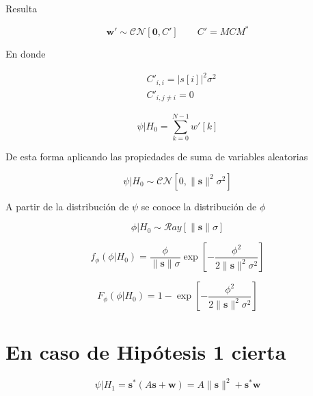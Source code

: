 Resulta

\begin{equation}
    \mathbf{w}'  \sim \mathcal{CN}[\mathbf{0}, C'] \qquad C' = MCM^\ast
\end{equation}

En donde

\begin{equation}
    \begin{aligned}
        &C'_{i,i} = |s[i]|^2 \sigma^2\\
        &C'_{i,j\ne i} = 0        
    \end{aligned}
\end{equation}

\begin{equation}
    \psi | H_0 = \sum_{k=0}^{N-1} w'[k]
\end{equation}

De esta forma aplicando las propiedades de suma de variables aleatorias

\begin{equation}
    \psi | H_0 \sim \mathcal{CN}\left[0, \lVert \mathbf{s} \rVert^2  \sigma^2 \right]
\end{equation}

A partir de la distribución de $\psi$ se conoce la distribución de $\phi$

\begin{equation}
    \phi | H_0 \sim \mathcal{R}ay \left[\lVert \mathbf{s}\rVert \sigma\right]
\end{equation}

\begin{equation}
    f_\phi(\phi|H_0) = \frac{\phi}{\lVert\mathbf{s}\rVert \sigma}\exp\left[-\frac{\phi^2}{2\lVert\mathbf{s}\rVert^2 \sigma^2}\right]
\end{equation}
    
\begin{equation}
    F_\phi(\phi|H_0) = 1- \exp\left[-\frac{\phi^2}{2\lVert\mathbf{s}\rVert^2 \sigma^2}\right]    
\end{equation}

\section{En caso de Hipótesis 1 cierta}

\begin{equation}
    \psi | H_1 = \mathbf{s}^\ast\left(A\mathbf{s}+\mathbf{w}\right) = A\lVert\mathbf{s}\rVert^2+\mathbf{s}^\ast\mathbf{w}
\end{equation}

